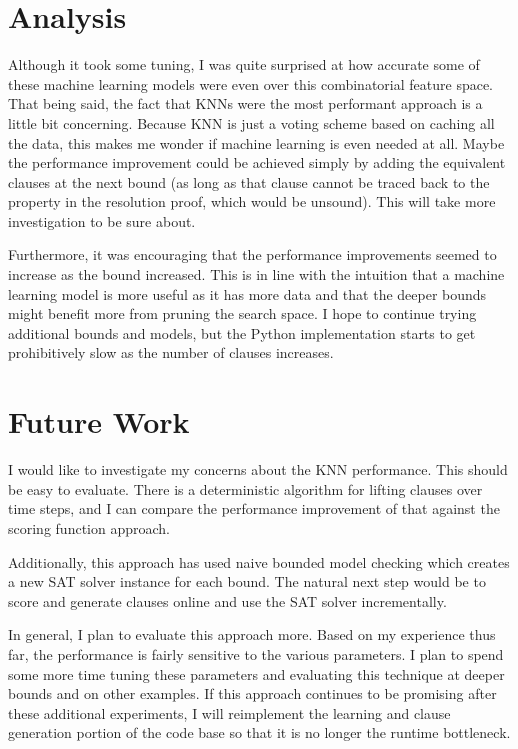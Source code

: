 \documentclass[letterpaper]{article} %
\begin{document}
\section{Analysis}

Although it took some tuning, I was quite surprised at how accurate some of these machine learning models were even over this combinatorial feature space. That being said, the fact that KNNs were the most performant approach is a little bit concerning. Because KNN is just a voting scheme based on caching all the data, this makes me wonder if machine learning is even needed at all. Maybe the performance improvement could be achieved simply by adding the equivalent clauses at the next bound (as long as that clause cannot be traced back to the property in the resolution proof, which would be unsound). This will take more investigation to be sure about.

Furthermore, it was encouraging that the performance improvements seemed to increase as the bound increased. This is in line with the intuition that a machine learning model is more useful as it has more data and that the deeper bounds might benefit more from pruning the search space. I hope to continue trying additional bounds and models, but the Python implementation starts to get prohibitively slow as the number of clauses increases.

\section{Future Work}

I would like to investigate my concerns about the KNN performance. This should be easy to evaluate. There is a deterministic algorithm for lifting clauses over time steps, and I can compare the performance improvement of that against the scoring function approach.

Additionally, this approach has used naive bounded model checking which creates a new SAT solver instance for each bound. The natural next step would be to score and generate clauses online and use the SAT solver incrementally.

In general, I plan to evaluate this approach more. Based on my experience thus far, the performance is fairly sensitive to the various parameters. I plan to spend some more time tuning these parameters and evaluating this technique at deeper bounds and on other examples. If this approach continues to be promising after these additional experiments, I will reimplement the learning and clause generation portion of the code base so that it is no longer the runtime bottleneck.
\end{document}
